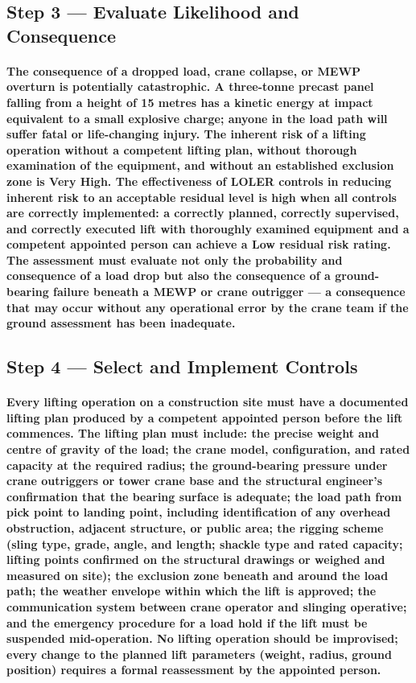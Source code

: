 \subsection{Step 3 --- Evaluate Likelihood and Consequence}
\paragraph{The consequence of a dropped load, crane collapse, or MEWP overturn is potentially catastrophic. A three-tonne precast panel falling from a height of 15 metres has a kinetic energy at impact equivalent to a small explosive charge; anyone in the load path will suffer fatal or life-changing injury. The inherent risk of a lifting operation without a competent lifting plan, without thorough examination of the equipment, and without an established exclusion zone is Very High. The effectiveness of LOLER controls in reducing inherent risk to an acceptable residual level is high when all controls are correctly implemented: a correctly planned, correctly supervised, and correctly executed lift with thoroughly examined equipment and a competent appointed person can achieve a Low residual risk rating. The assessment must evaluate not only the probability and consequence of a load drop but also the consequence of a ground-bearing failure beneath a MEWP or crane outrigger --- a consequence that may occur without any operational error by the crane team if the ground assessment has been inadequate.}

\subsection{Step 4 --- Select and Implement Controls}
\paragraph{Every lifting operation on a construction site must have a documented lifting plan produced by a competent appointed person before the lift commences. The lifting plan must include: the precise weight and centre of gravity of the load; the crane model, configuration, and rated capacity at the required radius; the ground-bearing pressure under crane outriggers or tower crane base and the structural engineer's confirmation that the bearing surface is adequate; the load path from pick point to landing point, including identification of any overhead obstruction, adjacent structure, or public area; the rigging scheme (sling type, grade, angle, and length; shackle type and rated capacity; lifting points confirmed on the structural drawings or weighed and measured on site); the exclusion zone beneath and around the load path; the weather envelope within which the lift is approved; the communication system between crane operator and slinging operative; and the emergency procedure for a load hold if the lift must be suspended mid-operation. No lifting operation should be improvised; every change to the planned lift parameters (weight, radius, ground position) requires a formal reassessment by the appointed person.}

